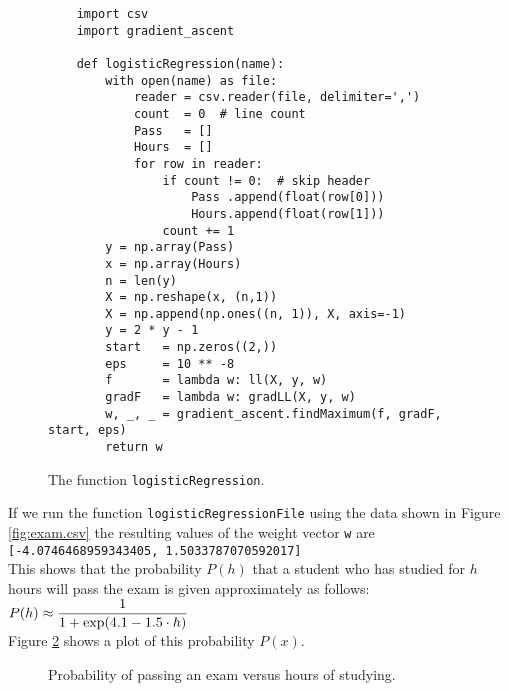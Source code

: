 \begin{figure}[!ht]
\centering

\begin{verbatim}              
    import csv
    import gradient_ascent

    def logisticRegression(name):
        with open(name) as file:
            reader = csv.reader(file, delimiter=',')
            count  = 0  # line count
            Pass   = []
            Hours  = []
            for row in reader:
                if count != 0:  # skip header
                    Pass .append(float(row[0]))
                    Hours.append(float(row[1]))
                count += 1
        y = np.array(Pass)
        x = np.array(Hours)
        n = len(y)
        X = np.reshape(x, (n,1))
        X = np.append(np.ones((n, 1)), X, axis=-1)
        y = 2 * y - 1
        start   = np.zeros((2,))
        eps     = 10 ** -8
        f       = lambda w: ll(X, y, w)
        gradF   = lambda w: gradLL(X, y, w)
        w, _, _ = gradient_ascent.findMaximum(f, gradF, start, eps)
        return w
\end{verbatim}

\caption{The function \texttt{logisticRegression}.}
\label{fig:logistic_regression.py:2}
\end{figure}

If we run the function \texttt{logisticRegressionFile} using the data shown in Figure
\ref{fig:exam.csv} the resulting values of the weight vector \texttt{w} are
\\[0.2cm]
\hspace*{1.3cm}
\texttt{[-4.0746468959343405, 1.5033787070592017]}
\\[0.2cm]
This shows that the probability $P(h)$ that a student who has studied for $h$ hours will pass the
exam is given approximately as follows:
\\[0.2cm]
\hspace*{1.3cm}
$\displaystyle P(h) \approx \frac{1}{1 + \exp(4.1 - 1.5 \cdot h)}$
\\[0.2cm]
Figure \ref{fig:exam-probability.pdf} shows a plot of this probability $P(x)$.  

\begin{figure}[!th]
\caption{Probability of passing an exam versus hours of studying.}
\label{fig:exam-probability.pdf}
\end{figure}



